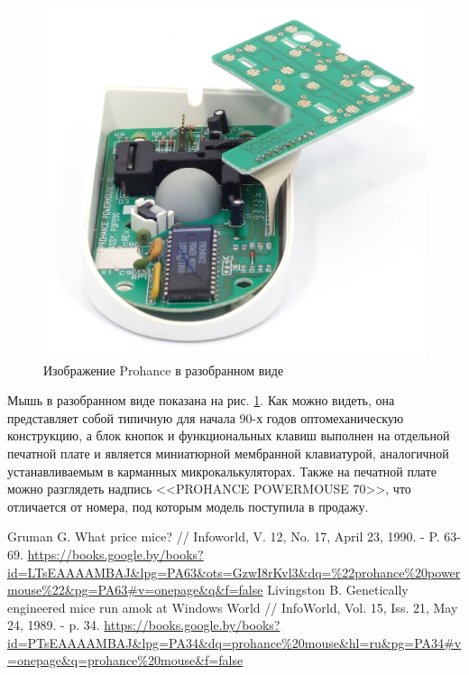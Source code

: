 \documentclass[11pt, a4paper]{article}
\begin{document}
\begin{figure}[h]
    \centering
    \includegraphics[scale=0.8]{1989_prohance_powermouse/inside_60.jpg}
    \caption{Изображение Prohance в разобранном виде}
    \label{fig:ProhanceInside}
\end{figure}

Мышь в разобранном виде показана на рис. \ref{fig:ProhanceInside}. Как можно видеть, она представляет собой типичную для начала 90-х годов оптомеханическую конструкцию, а блок кнопок и функциональных клавиш выполнен на отдельной печатной плате и является миниатюрной мембранной клавиатурой, аналогичной устанавливаемым в карманных микрокалькуляторах. Также на печатной плате можно разглядеть надпись <<PROHANCE POWERMOUSE 70>>, что отличается от номера, под которым модель поступила в продажу.

\begin{thebibliography}{9}
 Gruman G. What price mice? // Infoworld, V. 12, No. 17, April 23, 1990. - P. 63-69. \url{https://books.google.by/books?id=LTsEAAAAMBAJ&lpg=PA63&ots=GzwI8rKvl3&dq=%22prohance%20powermouse%22&pg=PA63#v=onepage&q&f=false}
 Livingston B. Genetically engineered mice run amok at Windows World // InfoWorld, Vol. 15, Iss. 21, May 24, 1989. - p. 34. \url{https://books.google.by/books?id=PTsEAAAAMBAJ&lpg=PA34&dq=prohance%20mouse&hl=ru&pg=PA34#v=onepage&q=prohance%20mouse&f=false}
\end{thebibliography}
\end{document}
